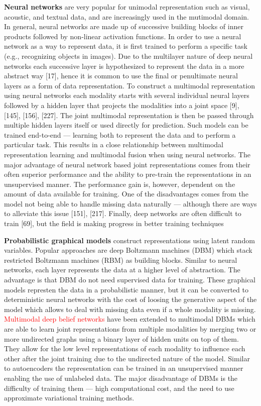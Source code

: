 \textbf{Neural networks} are very popular for unimodal representation such as visual, acoustic, and textual data, and are increasingly used in the mutimodal domain.
In general, neural networks are made up of successive building blocks of inner products followed by non-linear activation functions. In order to use a neural network as a way to represent data, it is first trained to perform a specific task (e.g., recognizing objects in images). Due to the multilayer nature of deep neural networks each successive layer is hypothesized to represent the data in a more abstract way [17], hence it is common to use the final or penultimate neural layers as a form of data representation. To construct a multimodal representation using neural networks each modality starts with several individual neural layers followed by a hidden layer that projects the modalities into a joint space [9], [145], [156], [227]. The joint multimodal representation is then be passed through multiple hidden layers itself or used directly for prediction. Such models can be trained end-to-end — learning both to represent the data and to perform a particular task.
This results in a close relationship between multimodal representation learning and multimodal fusion when using neural networks.
The major advantage of neural network based joint representations
comes from their often superior performance
and the ability to pre-train the representations in an unsupervised
manner. The performance gain is, however, dependent on the amount of data available for training. One of the disadvantages comes from the model not being able to handle missing data naturally — although there are ways to alleviate this issue [151], [217]. Finally, deep networks are often difficult to train [69], but the field is making progress in better training techniques

\textbf{Probabilistic graphical models} construct representations using latent random variables. Popular approaches are deep Boltzmann machines (DBM) which stack restricted Boltzmann machines (RBM) as building blocks. Similar to neural networks, each layer represents the data at a higher level of abstraction. The advantage is that DBM do not need supervised data for training. These graphical models represten the data in a probabilistic manner, but it can be converted to deterministic neural networks with the cost of loosing the generative aspect of the model which allows to deal with missing data even if a whole modality is missing.
\textcolor{red}{Multimodal deep belief networks } have been extended to multimodal DBMs which are able to learn joint representations from multiple modalities by merging two or more undirected graphs using a binary layer of hidden units on top of them. They allow for the low level representations of each modality to influence each other after the joint training due to the undirected nature of the model. Similar to autoencoders
the representation can be trained in an unsupervised manner enabling the use of unlabeled data. The major disadvantage of DBMs is the difficulty of training them — high computational cost, and the need to use approximate variational training methods.

